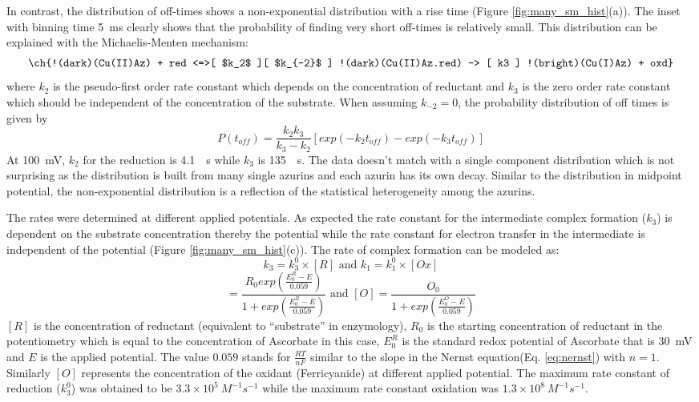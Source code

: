 In contrast, the distribution of off-times shows a non-exponential distribution with a rise time (Figure \ref{fig:many_sm_hist}(a)).
The inset with binning time \SI{5}{\ms} clearly shows that the probability of finding very short off-times is relatively small.
This distribution can be explained with the Michaelis-Menten mechanism:
\begin{align}
	\ch{!(dark)(Cu(II)Az) + red <=>[ $k_2$ ][ $k_{-2}$ ] !(dark)(Cu(II)Az.red) -> [ k3 ] !(bright)(Cu(I)Az) + oxd}
	\label{eq:reduction}
\end{align}
where $k_2$ is the pseudo-first order rate constant which depends on the concentration of reductant and $k_3$ is the zero order rate constant which should be independent of the concentration of the substrate.
When assuming $k_{-2}=0$, the probability distribution of off times is given by\cite{lu1998single-molecule}
\begin{equation}
	P(t_{off}) = \frac{k_2k_3}{k_3-k_2} [exp(-k_2t_{off})-exp(-k_3t_{off})]
	\label{eq:2exp_risetime}
\end{equation}
At \SI{100}{\mV}, $k_2$ for the reduction is \SI{4.1}{\per\s} while $k_3$ is \SI{135}{\per\s}.
The data doesn't match with a single component distribution which is not surprising as the distribution is built from many single azurins and each azurin has its own decay.
Similar to the distribution in midpoint potential, the non-exponential distribution is a reflection of the statistical heterogeneity among the azurins.

The rates were determined at different applied potentials.
As expected the rate constant for the intermediate complex formation ($k_3$) is dependent on the substrate concentration thereby the potential while the rate constant for electron transfer in the intermediate is independent of the potential (Figure \ref{fig:many_sm_hist}(c)).
The rate of complex formation can be modeled as:
\begin{equation}
	k_3 =k_3^0\times[R] \text{ and } k_1 =k_1^0\times[Ox]
	\label{eq:rate_complex}
\end{equation}
\begin{equation}
	[R] = \frac{R_0exp(\frac{E_0^R-E}{0.059})}{1+exp(\frac{E_0^R-E}{0.059})}
	\text{ and } [O] = \frac{O_0}{1+exp(\frac{E_0^O-E}{0.059})}
	\label{eq:conc_potential}
\end{equation}
$[R]$ is the concentration of reductant (equivalent to ``substrate'' in enzymology), $R_0$ is the starting concentration of reductant in the potentiometry which is equal to the concentration of Ascorbate in this case, $E_0^R$ is the standard redox potential of Ascorbate that is \SI{30}{\mV} and $E$ is the applied potential. The value $0.059$ stands for $\frac{RT}{nF}$ similar to the slope in the Nernst equation(Eq. \ref{eq:nernst}) with $n=1$.
Similarly $[O]$ represents the concentration of the oxidant (Ferricyanide) at different applied potential.
The maximum rate constant of reduction ($k_3^0$) was obtained to be $3.3\times10^5~M^{-1}s^{-1}$ while the maximum rate constant oxidation was $1.3\times10^8~M^{-1}s^{-1}$.
